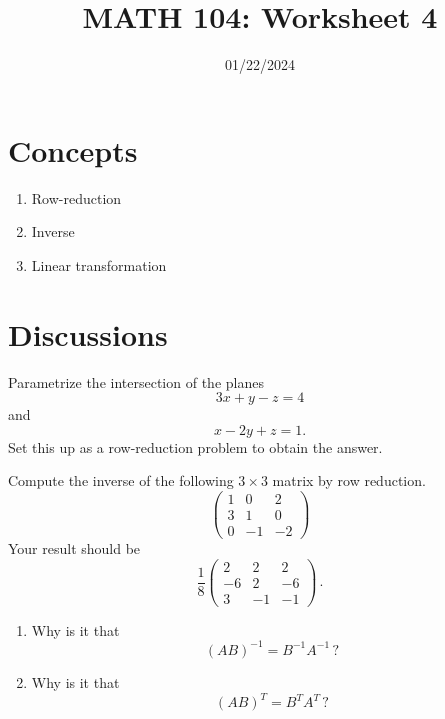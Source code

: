 \documentclass[12pt]{amsart}
\title{ MATH 104: Worksheet 4}
\author{}
\date{01/22/2024}
\begin{document}
\maketitle

\section{Concepts}

\begin{enumerate}
    \item Row-reduction 
    \item Inverse
    \item Linear transformation
\end{enumerate}

\section{Discussions}

\begin{question}
    Parametrize the intersection of the planes
    $$ 3x + y -z = 4$$
    and
    $$x - 2y + z = 1. $$
    Set this up as a row-reduction problem to obtain the answer.
\end{question}

\begin{question}
    Compute the inverse of the following $3\times 3$ matrix by row reduction.
    \begin{equation*}
        \begin{pmatrix}
            1 & 0 & 2 \\
            3 & 1 & 0 \\
            0 & -1 & -2
        \end{pmatrix}
    \end{equation*}
    Your result should be
    \begin{equation*}
        \frac{1}{8} 
        \begin{pmatrix}
            2 & 2 & 2 \\
            -6 & 2 & -6 \\
            3 & -1 & -1
        \end{pmatrix} \,.
    \end{equation*}
\end{question}

\begin{question}
    \begin{enumerate}
        \item Why is it that
            \begin{equation*}
                (AB)^{-1} = B^{-1} A^{-1} \,?
            \end{equation*} 
        \item Why is it that
            \begin{equation*}
                (AB)^T = B^T A^T \,?
            \end{equation*}
    \end{enumerate}
\end{question}
\end{document}
